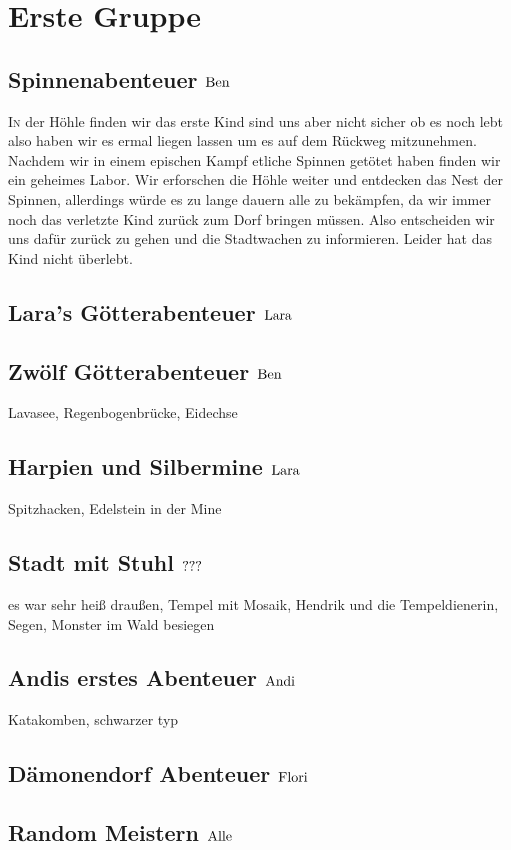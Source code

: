 \chapter{Erste Gruppe}
\section{Spinnenabenteuer \hfill $\rm{Ben}$}
\lettrine{I}{n} der H\"ohle finden wir das erste Kind sind uns aber nicht sicher ob es noch lebt also haben wir es ermal liegen lassen um es auf dem R\"uckweg mitzunehmen. Nachdem wir in einem epischen Kampf etliche Spinnen get\"otet haben finden wir ein geheimes Labor. Wir erforschen die H\"ohle weiter und entdecken das Nest der Spinnen, allerdings w\"urde es zu lange dauern alle zu bek\"ampfen, da wir immer noch das verletzte Kind zur\"uck zum Dorf bringen m\"ussen. Also entscheiden wir uns daf\"ur zur\"uck zu gehen und die Stadtwachen zu informieren. Leider hat das Kind nicht \"uberlebt.

\section{Lara's G\"otterabenteuer \hfill $\rm{Lara}$}
\section{Zw\"olf G\"otterabenteuer \hfill $\rm{Ben}$}
Lavasee, Regenbogenbr\"ucke, Eidechse
\section{Harpien und Silbermine \hfill $\rm{Lara}$}
Spitzhacken, Edelstein in der Mine
\section{Stadt mit Stuhl \hfill $\rm{???}$}
es war sehr heiß draußen, Tempel mit Mosaik, Hendrik und die Tempeldienerin, Segen, Monster im Wald besiegen
\section{Andis erstes Abenteuer \hfill $\rm{Andi}$}
Katakomben, schwarzer typ
\section{D\"amonendorf Abenteuer \hfill $\rm{Flori}$}
\section{Random Meistern \hfill $\rm{Alle}$}
